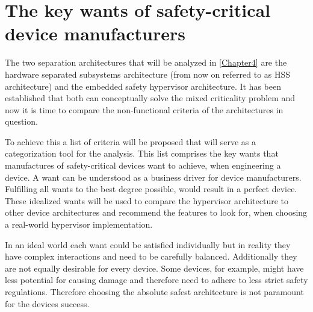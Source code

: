 
\chapter{The key wants of safety-critical device manufacturers} %

\label{Chapter3} %


\newcommand{\keyword}[1]{\textbf{#1}}
\newcommand{\tabhead}[1]{\textbf{#1}}
\newcommand{\code}[1]{\texttt{#1}}
\newcommand{\file}[1]{\texttt{\bfseries#1}}
\newcommand{\option}[1]{\texttt{\itshape#1}}


The two separation architectures that will be analyzed in \ref{Chapter4} are the hardware separated subsystems architecture (from now on referred to as \gls{HSS} architecture) and the embedded safety hypervisor architecture. It has been established that both can conceptually solve the mixed criticality problem and now it is time to compare the non-functional criteria of the architectures in question. 

To achieve this a list of criteria will be proposed that will serve as a categorization tool for the analysis.
This list comprises the key wants that manufactures of safety-critical devices want to achieve, when engineering a device. A want can be understood as a business driver for device manufacturers. Fulfilling all wants to the best degree possible, would result in a perfect device. These idealized wants will be used to compare the hypervisor architecture to other device architectures and recommend the features to look for, when choosing a real-world hypervisor implementation.

In an ideal world each want could be satisfied individually but in reality they have complex interactions and need to be carefully balanced. 
Additionally they are not equally desirable for every device. Some devices, for example, might have less potential for causing damage and therefore need to adhere to less strict safety regulations. Therefore choosing the absolute safest architecture is not paramount for the devices success.

